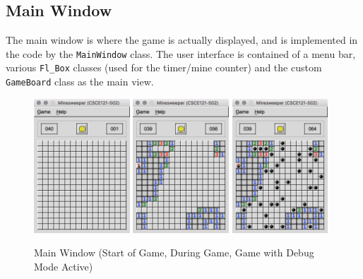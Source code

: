 \documentclass[11pt]{article}
\begin{document}
\subsection{Main Window}
The main window is where the game is actually displayed, and is implemented in the code  by the \texttt{MainWindow} class. The user interface is contained of a menu bar, various \texttt{Fl\_Box} classes (used for the timer/mine counter) and the custom \texttt{GameBoard} class as the main view.

\begin{figure}[htbp]
   \centering
   \includegraphics[width=0.32\textwidth]{main.png}
   \includegraphics[width=0.32\textwidth]{mainProgress.png}
   \includegraphics[width=0.32\textwidth]{mainProgressDebug.png}
   \caption{Main Window (Start of Game, During Game, Game with Debug Mode Active)}
\end{figure}
\end{document}
